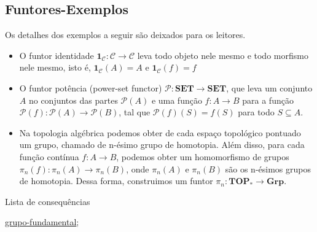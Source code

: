 \subsection{Funtores-Exemplos}
\label{funtor-categorias-ex}

\begin{ex}
	Os detalhes dos exemplos a seguir são deixados para os leitores.
\begin{itemize}

    \item O funtor identidade $\mathbf{1}_{\mathcal{C}}: \mathcal{C} \longrightarrow \mathcal{C}$ leva todo objeto nele mesmo e todo morfismo nele mesmo, isto é, $\mathbf{1}_{\mathcal{C}}(A) = A$ e $\mathbf{1}_{\mathcal{C}}(f) = f$
    
    \item O funtor potência (power-set functor) $\mathcal{P}:\mathbf{SET} \longrightarrow \mathbf{SET}$, que leva um conjunto $A$ no conjuntos das partes $\mathcal{P}(A)$ e uma função $f:A \longrightarrow B$ para a função $\mathcal{P}(f): \mathcal{P}(A) \longrightarrow \mathcal{P}(B)$, tal que $\mathcal{P}(f)(S) = f(S)$ para todo $S \subseteq A$.

    \item Na topologia algébrica podemos obter de cada espaço topológico pontuado um grupo, chamado de n-ésimo grupo de homotopia. Além disso, para cada função contínua $f: A \longrightarrow B$, podemos obter um homomorfismo de grupos $\pi_n(f):\pi_n(A) \longrightarrow \pi_n(B)$, onde $\pi_n(A)$ e $\pi_n(B)$ são os n-ésimos grupos de homotopia. Dessa forma, construimos um funtor $\pi_n: \mathbf{TOP}_* \longrightarrow \mathbf{Grp}$. 

\end{itemize}
\end{ex}

 

\begin{titlemize}{Lista de consequências}
	\item \hyperref[grupo-fundamental]{grupo-fundamental};\\ %
\end{titlemize}
